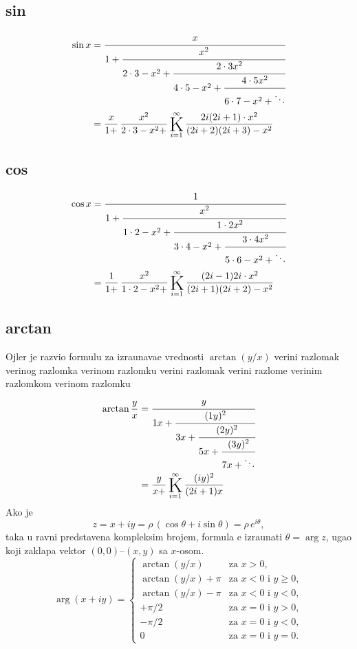 \documentclass[12pt, twoside, a4paper]{article}
\def\vr#1{\ifcase#1\relax\or
  ve\-ri{\zv}\-ni raz\-lo\-mak\or
  ve\-ri{\zv}\-nog raz\-lom\-ka\or
  ve\-ri{\zv}\-nom raz\-lom\-ku\or
  ve\-ri{\zv}\-ni raz\-lo\-mak\or
  ve\-ri{\zv}\-ni raz\-lom\-{\cv}e\or
  ve\-ri{\zv}\-nim raz\-lom\-kom\or
  ve\-ri{\zv}\-nom raz\-lom\-ku\fi}
\begin{document}
\subsection{sin}

\begin{align*}
\sin x
&=\cfrac{x}{1+\cfrac{x^2}{2\cdot3-x^2+\cfrac{2\cdot3x^2}{4\cdot5-x^2+\cfrac{4\cdot5x^2}{6\cdot7-x^2+\ddots}}}}\\
\noalign{\smallskip}
&=\frac{x}{1+}\,\frac{x^2}{2\cdot3-x^2+}\Kinf{2i(2i+1)\cdot x^2}{(2i+2)(2i+3)-x^2}
\end{align*}

\subsection{cos}

\begin{align*}
\cos x
&=\cfrac{1}{1+\cfrac{x^2}{1\cdot2-x^2+\cfrac{1\cdot2x^2}{3\cdot4-x^2+\cfrac{3\cdot4x^2}{5\cdot6-x^2+\ddots}}}}\\
\noalign{\smallskip}
&=\frac{1}{1+}\,\frac{x^2}{1\cdot2-x^2+}\Kinf{(2i-1)2i\cdot x^2}{(2i+1)(2i+2)-x^2}
\end{align*}


\subsection{arctan}

Ojler je razvio formulu za izra{\cv}unava{\nj}e vrednosti
$\arctan(y/x)$ \vr6
\begin{align*}
\arctan{y\over x} &=
\cfrac{y}{1x+\cfrac{(1y)^2}{3x+\cfrac{(2y)^2}{5x+\cfrac{(3y)^2}{7x+\ddots}}}}\\
&={y\over x+}\Kinf{(iy)^2}{(2i+1)x}
\end{align*}
Ako je 
$$z=x+iy=\rho\,(\cos\theta+i\sin\theta)=\rho\,e^{i\theta},$$ 
ta{\cv}ka u ravni predstav{\lj}ena kompleksim brojem, 
formula {\cc}e iz\-ra\-{\cv}u\-na\-ti $\theta=\arg z$,
ugao koji zaklapa vektor $(0,0)$--$(x,y)$ sa $x$-osom.
$$
\arg(x+iy)=
\begin{cases}
\arctan(y/x)&\text{za $x>0$},\\
\arctan(y/x)+\pi&\text{za $x<0$ i $y\ge0$},\\
\arctan(y/x)-\pi&\text{za $x<0$ i $y<0$},\\
+\pi/2&\text{za $x=0$ i $y>0$},\\
-\pi/2&\text{za $x=0$ i $y<0$},\\
0&\text{za $x=0$ i $y=0$}.
\end{cases}
$$
\end{document}
